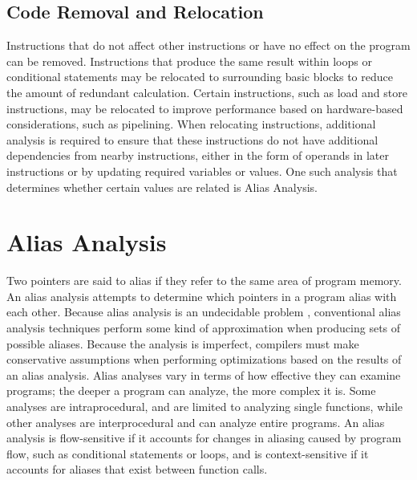 \subsection{Code Removal and Relocation}
Instructions that do not affect other instructions or have no effect on the program can be removed. Instructions that produce the same result within loops or conditional statements may be relocated to surrounding basic blocks to reduce the amount of redundant calculation. Certain instructions, such as load and store instructions, may be relocated to improve performance based on hardware-based considerations, such as pipelining. When relocating instructions, additional analysis is required to ensure that these instructions do not have additional dependencies from nearby instructions, either in the form of operands in later instructions or by updating required variables or values. One such analysis that determines whether certain values are related is Alias Analysis.

\section{Alias Analysis}
Two pointers are said to alias if they refer to the same area of program memory. An alias analysis attempts to determine which pointers in a program alias with each other. Because alias analysis is an undecidable problem \cite{undecidable}, conventional alias analysis techniques perform some kind of approximation when producing sets of possible aliases. Because the analysis is imperfect, compilers must make conservative assumptions when performing optimizations based on the results of an alias analysis. Alias analyses vary in terms of how effective they can examine programs; the deeper a program can analyze, the more complex it is. Some analyses are intraprocedural, and are limited to analyzing single functions, while other analyses are interprocedural and can analyze entire programs. An alias analysis is flow-sensitive if it accounts for changes in aliasing caused by program flow, such as conditional statements or loops, and is context-sensitive if it accounts for aliases that exist between function calls.
